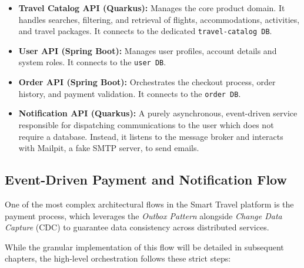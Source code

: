 \begin{itemize}
    \item \textbf{Travel Catalog API (Quarkus):} Manages the core product domain. It handles searches, filtering, and retrieval of flights, accommodations, activities, and travel packages. It connects to the dedicated \texttt{travel-catalog DB}.
    \item \textbf{User API (Spring Boot):} Manages user profiles, account details and system roles. It connects to the \texttt{user DB}.
    \item \textbf{Order API (Spring Boot):} Orchestrates the checkout process, order history, and payment validation. It connects to the \texttt{order DB}.
    \item \textbf{Notification API (Quarkus):} A purely asynchronous, event-driven service responsible for dispatching communications to the user which does not require a database. Instead, it listens to the message broker and interacts with Mailpit, a fake SMTP server, to send emails.
\end{itemize}

\subsection{Event-Driven Payment and Notification Flow}

One of the most complex architectural flows in the Smart Travel platform is the payment process, which leverages the \textit{Outbox Pattern} alongside \textit{Change Data Capture} (\gls{CDC}) to guarantee data consistency across distributed services.

While the granular implementation of this flow will be detailed in subsequent chapters, the high-level orchestration follows these strict steps:

